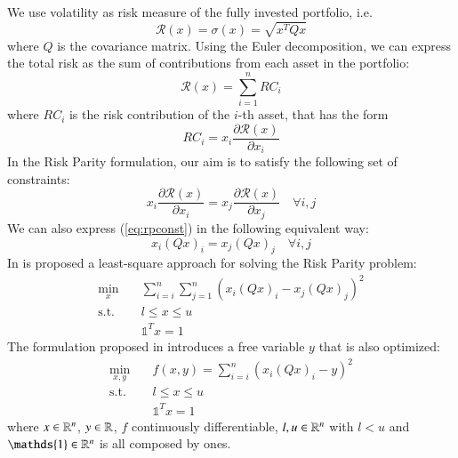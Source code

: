 We use volatility as risk measure of the fully invested portfolio, i.e.
\begin{equation}
\mathcal{R}(x) = \sigma(x) = \sqrt{x^T Q x}
\end{equation}
where $Q$ is the covariance matrix. Using the Euler decomposition, we can express the total risk as the sum of contributions from each asset in the portfolio:
\begin{equation}
\mathcal{R}(x) = \sum_{i=1}^n RC_i 
\end{equation}
where $RC_i$ is the risk contribution of the $i$-th asset, that has the form
\begin{equation}
RC_i = x_i \frac{\partial \mathcal{R}(x)}{\partial x_i}
\end{equation}
In the Risk Parity formulation, our aim is to satisfy the following set of constraints:
\begin{equation}\label{eq:rpconst}
x_i \frac{\partial \mathcal{R}(x)}{\partial x_i}= x_j \frac{\partial \mathcal{R}(x)}{\partial x_j} \quad \forall i,j
\end{equation}
We can also express (\ref{eq:rpconst}) in the following equivalent way:
\begin{equation}
x_i (Q x)_i = x_j (Q x)_j \quad \forall i,j
\end{equation}
In \cite{maillard} is proposed a least-square approach for solving the Risk Parity problem:
\begin{subequations}
\begin{align}
\min_x & \quad \sum_{i=i}^n \sum_{j=1}^{n}\left(x_i(Q x)_i - x_j(Q x)_j\right)^2\\
\text{s.t.} & \quad l \leq x \leq u \\
& \quad \mathds{1}^T x = 1 
\end{align}
\end{subequations}
The formulation proposed in \cite{tutuncu} introduces a free variable $y$ that is also optimized:
\begin{subequations}\label{eq:problem} 
\begin{align}
\min_{x,y} & \quad f(x,y) =  \sum_{i=i}^n \left(x_i(Q x)_i - y\right)^2 \\
\text{s.t.} & \quad l \leq x \leq u \\
& \quad \mathds{1}^T x = 1 
\end{align}
\end{subequations}
where $x \in \mathbb{R}^n$, $y \in \mathbb{R}$, $f$ continuously differentiable, $l, u \in \mathbb{R}^n$ with $l < u$ and $\mathds{1} \in \R^n$ is all composed by ones. \\
